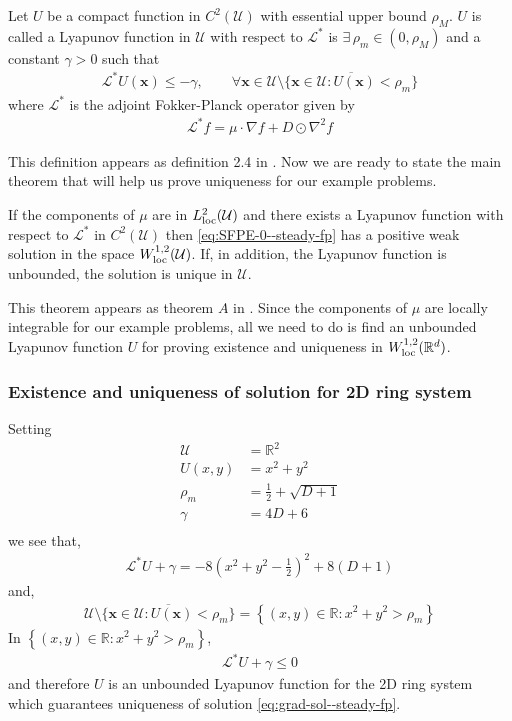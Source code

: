 \begin{defn}
    Let $U$ be a compact function in $C^2(\mathcal U)$ with essential upper bound $\rho_M$. $U$ is called a Lyapunov function in $\mathcal U$ with respect to $\mathcal L^*$ is $\exists\,\rho_m\in(0, \rho_M)$ and a constant $\gamma>0$ such that
    \begin{align}
        \mathcal L^* U(\mathbf x)\le -\gamma,\qquad\forall \mathbf x\in \mathcal U\setminus\overline{\{\mathbf x\in\mathcal U: U(\mathbf x)<\rho_m\}}
    \end{align}
    where $\mathcal L^*$ is the adjoint Fokker-Planck operator given by
    \begin{align}
        \mathcal L^*f = \mu\cdot\nabla f+ D\odot\nabla^2 f \label{eq:def-adjoint-FP-op--steady-fp}
    \end{align}
\end{defn}
This definition appears as definition 2.4 in \cite{huang2015steady}.
Now we are ready to state the main theorem that will help us prove uniqueness for our example problems.
\begin{thm}
    If the components of $\mu$ are in $L^2_{\rm loc}(\mathcal U)$ and there exists a Lyapunov function with respect to $\mathcal L^*$ in $C^2(\mathcal U)$ then \eqref{eq:SFPE-0--steady-fp} has a positive weak solution in the space $W^{1, 2}_{\rm loc}(\mathcal U)$. If, in addition,
the Lyapunov function is unbounded, the solution is unique in $\mathcal U$.\label{thm:unique-steady--steady-fp}
\end{thm}
This theorem appears as theorem $A$ in \cite{huang2015steady}. Since the components of $\mu$ are locally integrable for our example problems, all we need to do is find an unbounded Lyapunov function $U$ for proving existence and uniqueness in $W^{1,2}_{\rm loc}(\mathbb R^d)$.
\subsubsection{Existence and uniqueness of solution for 2D ring system}\label{sssec-2D-unique--steady-fp}
Setting 
\begin{align}
\mathcal U &= \mathbb R^2\\
U(x, y) &= x^2+y^2\\
\rho_m &= \frac{1}{2}+\sqrt{D+1}\\
\gamma &= 4D+6\\
\end{align}
we see that,
\begin{align}
    \mathcal L^*U +\gamma = -8\left(x^2+y^2-\frac{1}{2}\right)^2 + 8(D+1)
\end{align}
and,
\begin{align}
    \mathcal U\setminus\overline{\{\mathbf x\in\mathcal U: U(\mathbf x)<\rho_m\}} = \left\{(x,y)\in\mathbb R: x^2+y^2>\rho_m\right\}
\end{align}
In  $\left\{(x,y)\in\mathbb R: x^2+y^2>\rho_m\right\}$, 
\begin{align}
    \mathcal L^*U+\gamma \le 0
\end{align}
and therefore $U$ is an unbounded Lyapunov function for the 2D ring system which guarantees uniqueness of solution \eqref{eq:grad-sol--steady-fp}.

